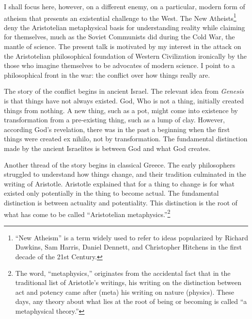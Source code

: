 \documentclass{article}
\begin{document}
I shall focus here, however, on a different enemy, on a particular, modern form
of atheism that presents an existential challenge to the West.  The New
Atheists\footnote{%
   ``New Atheism'' is a term widely used to refer to ideas popularized by
   Richard Dawkins, Sam Harris, Daniel Dennett, and Christopher Hitchens in the
   first decade of the 21st Century.
}
deny the Aristotelian metaphysical basis for understanding reality while
claiming for themselves, much as the Soviet Communists did during the Cold War,
the mantle of science.  The present talk is motivated by my interest in the
attack on the Aristotelian philosophical foundation of Western Civilization
ironically by the those who imagine themselves to be advocates of modern
science.  I point to a philosophical front in the war: the conflict over how
things really are.

The story of the conflict begins in ancient Israel.  The relevant idea from
{\it Genesis} is that things have not always existed.  God, Who is not a thing,
initially created things from nothing.  A new thing, such as a pot, might come
into existence by transformation from a pre-existing thing, such as a lump of
clay.  However, according God's revelation, there was in the past a beginning
when the first things were created ex nihilo, not by transformation.  The
fundamental distinction made by the ancient Israelites is between God and what
God creates.

Another thread of the story begins in classical Greece.  The early philosophers
struggled to understand how things change, and their tradition culminated in
the writing of Aristotle.  Aristotle explained that for a thing to change is
for what existed only potentially in the thing to become actual.  The
fundamental distinction is between actuality and potentiality.  This
distinction is the root of what has come to be called ``Aristotelian
metaphysics.''\footnote{%
   The word, ``metaphysics,'' originates from the accidental fact that in the
   traditional list of Aristotle's writings, his writing on the distinction
   between act and potency came after (meta) his writing on nature (physics).
   These days, any theory about what lies at the root of being or becoming is
   called ``a metaphysical theory.''%
}
\end{document}
